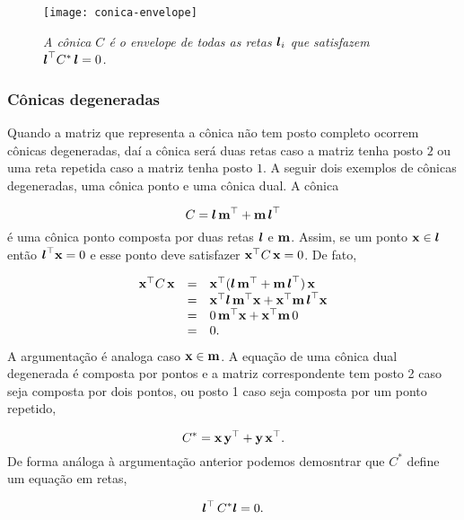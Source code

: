 \begin{figure}[!htb]
\centering
\texttt{[image: conica-envelope]}
\caption{\textit{A cônica $C$ é o envelope de todas as retas $\boldsymbol{l}_i$ que satisfazem $\boldsymbol{l}^\top C^*\,\boldsymbol{l}=0$.}}
\label{fig.conica-envelope}
\end{figure}

\subsubsection{Cônicas degeneradas}\label{sec.conicas-degeneradas}

Quando a matriz que representa a cônica não tem posto completo ocorrem cônicas degeneradas, daí a cônica será duas retas caso a matriz tenha posto $2$ ou uma reta repetida caso a matriz tenha posto $1$. A seguir dois exemplos de cônicas degeneradas, uma cônica ponto e uma cônica dual. A cônica 

\begin{equation*}
C=\boldsymbol{l}\,{\bf m}^\top+{\bf m}\,\boldsymbol{l}^\top
\end{equation*}
é uma cônica ponto composta por duas retas $\boldsymbol{l}$ e ${\bf m}$. Assim, se um ponto $\mathbf{x}\in\boldsymbol{l}$ então $\boldsymbol{l}^\top\mathbf{x}=0$ e esse ponto deve satisfazer $\mathbf{x}^\top C\,\mathbf{x}=0$. De fato,

\begin{equation*}
\begin{array}{rcl}
\mathbf{x}^\top C\,\mathbf{x}&=&\mathbf{x}^\top(\boldsymbol{l}\,{\bf m}^\top+{\bf m}\,\boldsymbol{l}^\top)\,\mathbf{x}\\
&=&\mathbf{x}^\top\boldsymbol{l}\,{\bf m}^\top\mathbf{x}+\mathbf{x}^\top {\bf m}\,\boldsymbol{l}^\top\mathbf{x}\\
&=&0\,{\bf m}^\top\mathbf{x}+\mathbf{x}^\top{\bf m}\,0\\
&=&0.
\end{array}
\end{equation*}
A argumentação é analoga caso $\mathbf{x}\in{\bf m}$. A equação de uma cônica dual degenerada é composta por pontos e a matriz correspondente tem posto 2 caso seja composta por dois pontos, ou posto 1 caso seja composta por um ponto repetido, 

\begin{equation*}
C^*=\mathbf{x}\,{\bf y}^\top+{\bf y}\,\mathbf{x}^\top.
\end{equation*}
De forma análoga à argumentação anterior podemos demosntrar que $C^*$ define um equação em retas,

\begin{equation*}
\boldsymbol{l}^\top\,C^*\boldsymbol{l}=0.
\end{equation*}

